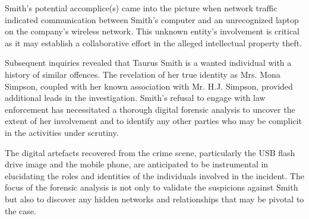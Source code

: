 Smith's potential accomplice(s) came into the picture when network traffic indicated communication between Smith's computer and an unrecognized laptop on the company's wireless network. This unknown entity's involvement is critical as it may establish a collaborative effort in the alleged intellectual property theft.

Subsequent inquiries revealed that Taurus Smith is a wanted individual with a history of similar offences. The revelation of her true identity as Mrs. Mona Simpson, coupled with her known association with Mr. H.J. Simpson, provided additional leads in the investigation. Smith's refusal to engage with law enforcement has necessitated a thorough digital forensic analysis to uncover the extent of her involvement and to identify any other parties who may be complicit in the activities under scrutiny.

The digital artefacts recovered from the crime scene, particularly the USB flash drive image and the mobile phone, are anticipated to be instrumental in elucidating the roles and identities of the individuals involved in the incident. The focus of the forensic analysis is not only to validate the suspicions against Smith but also to discover any hidden networks and relationships that may be pivotal to the case.
